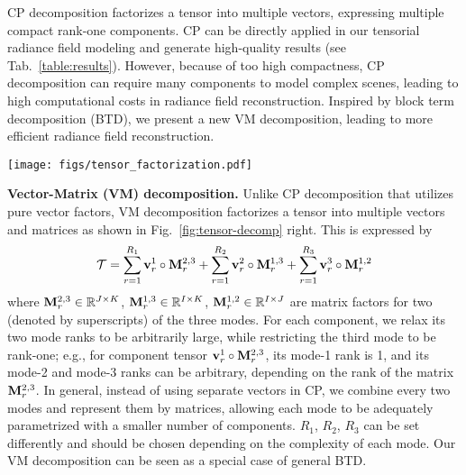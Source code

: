 \documentclass[runningheads]{llncs}
\newcommand{\boldstartspace}[1]{\vspace{0.1in}\noindent\textbf{#1}}
\begin{document}
CP decomposition factorizes a tensor into multiple vectors, expressing multiple compact rank-one components. 
CP can be directly applied in our tensorial radiance field modeling and generate high-quality results (see Tab.~\ref{table:results}). However, because of too high compactness, CP decomposition can require many components to model complex scenes, leading to high computational costs in radiance field reconstruction.
Inspired by block term decomposition (BTD), we present a new VM decomposition, leading to more efficient radiance field reconstruction.

\begin{figure*}[t]
    \texttt{[image: figs/tensor\_factorization.pdf]}
\caption{Tensor factorization. Left: CP decomposition (Eqn.~\ref{eqn:cpvector}), which factorizes a tensor as a sum of vector outer products.  Right: our vector-matrix decomposition (Eqn.~\ref{eqn:vmrrr}), which factorizes a tensor as a sum of vector-matrix outer products.}
    \label{fig:tensor-decomp}\vspace{-5mm}
\end{figure*}


\boldstartspace{Vector-Matrix (VM) decomposition.} Unlike CP decomposition that utilizes pure vector factors, VM decomposition factorizes a tensor into multiple vectors and matrices as shown in Fig.~\ref{fig:tensor-decomp} right. This is expressed by
\begin{equation}
    \mathcal{T} = \sum_{r=1}^{R_1} \mathbf{v}_r^{1} \circ \mathbf{M}_r^{2,3} + \sum_{r=1}^{R_2}\mathbf{v}_r^{2} \circ \mathbf{M}_r^{1,3} + \sum_{r=1}^{R_3}\mathbf{v}_r^{3} \circ \mathbf{M}_r^{1,2} 
    \label{eqn:vmrrr}
\end{equation}
where $\mathbf{M}_r^{2,3} \in \mathbb{R}^{J\times K}$, $\mathbf{M}_r^{1,3} \in \mathbb{R}^{I\times K}$, $\mathbf{M}_r^{1,2} \in \mathbb{R}^{I\times J}$ are matrix factors for two (denoted by superscripts) of the three modes.
For each component, we relax its two mode ranks to be arbitrarily large, while restricting the third mode to be rank-one; e.g., for component tensor $\mathbf{v}_r^{1} \circ \mathbf{M}_r^{2,3}$, its mode-1 rank is 1, and its mode-2 and mode-3 ranks can be arbitrary, depending on the rank of the matrix $\mathbf{M}_r^{2,3}$.
In general, instead of using separate vectors in CP, we combine every two modes and represent them by matrices, allowing each mode to be adequately parametrized with a smaller number of components. $R_1$, $R_2$, $R_3$ can be set differently and should be chosen depending on the complexity of each mode.
Our VM decomposition can be seen as a special case of general BTD. 
\end{document}
